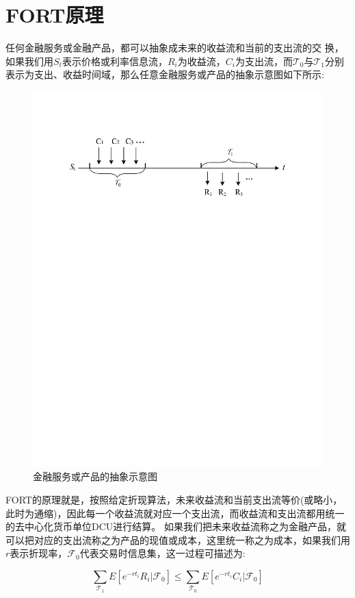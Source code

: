 \documentclass[letterpaper,11pt]{ctexart}
\begin{document}
\section{FORT原理}

任何金融服务或金融产品，都可以抽象成未来的收益流和当前的支出流的交
换，如果我们用$S_t$表示价格或利率信息流，$R_i$为收益流，$C_i$为支出流，而$\mathcal{T}_0$与$\mathcal{T}_1$分别表示为支出、收益时间域，那么任意金融服务或产品的抽象示意图如下所示:

\begin{figure}[h]
\centering
\includegraphics[width=4.5in]{fig-1}
\caption{金融服务或产品的抽象示意图}
\end{figure}

FORT的原理就是，按照给定折现算法，未来收益流和当前支出流等价(或略小，此时为通缩)，因此每一个收益流就对应一个支出流，而收益流和支出流都用统一的去中心化货币单位DCU进行结算。
如果我们把未来收益流称之为金融产品，就可以把对应的支出流称之为产品的现值或成本，这里统一称之为成本，如果我们用$r$表示折现率，$\mathcal{F}_0$代表交易时信息集，这一过程可描述为:

\begin{equation}
\sum_{\mathcal{T}_1} E\left[e^{-rt_{i}}R_{i}|\mathcal{F}_0\right] \leq \sum_{\mathcal{T}_0} E\left[e^{-rt_{i}}C_{i}|\mathcal{F}_0\right] 
\label{e1}
\end{equation}
\end{document}
